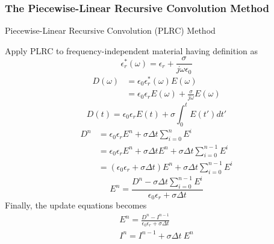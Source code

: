 \subsubsection{The Piecewise-Linear Recursive Convolution Method}
Piecewise-Linear Recursive Convolution (PLRC) Method

Apply PLRC to frequency-independent material having definition as
\begin{displaymath}
  \epsilon_r^{*}(\omega) = \epsilon_r + \frac{\sigma}{j \omega \epsilon_0}
\end{displaymath}
\begin{displaymath}
  \begin{split}
    D(\omega) & = \epsilon_0 \epsilon_r^{*}(\omega) E(\omega)\\
    & = \epsilon_0 \epsilon_r E(\omega) + \frac{\sigma}{j\omega}E(\omega)
  \end{split}
\end{displaymath}
\begin{displaymath}
  D(t) = \epsilon_0 \epsilon_rE(t) + \sigma \int_0^t E(t')dt'
\end{displaymath}
\begin{displaymath}
  \begin{split}
    D^n & = \epsilon_0 \epsilon_r E^n + \sigma \Delta t \sum_{i=0}^{n}E^i\\
    & = \epsilon_0 \epsilon_r E^n + \sigma \Delta t E^n + \sigma \Delta t \sum_{i=0}^{n-1}E^i\\
    & = (\epsilon_0 \epsilon_r + \sigma \Delta t) E^n + \sigma \Delta t \sum_{i=0}^{n-1}E^i
  \end{split}
\end{displaymath}
\begin{displaymath}
  E^n = \frac{\displaystyle D^n - \sigma \Delta t \sum_{i=0}^{n-1}E^i}{\epsilon_0 \epsilon_r + \sigma \Delta t}
\end{displaymath}
Finally, the update equations becomes
\begin{gather*}
  E^n = \frac{D^n - I^{n-1}}{\epsilon_0 \epsilon_r + \sigma \Delta t}\\
  I^n = I^{n-1} + \sigma \Delta t\ E^n
\end{gather*}

